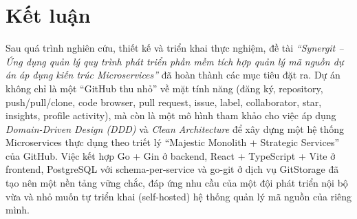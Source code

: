 \chapter{Kết luận}

Sau quá trình nghiên cứu, thiết kế và triển khai thực nghiệm, đề tài \textit{``Synergit -- Ứng dụng quản lý quy trình phát triển phần mềm tích hợp quản lý mã nguồn dự án áp dụng kiến trúc Microservices''} đã hoàn thành các mục tiêu đặt ra. Dự án không chỉ là một ``GitHub thu nhỏ'' về mặt tính năng (đăng ký, repository, push/pull/clone, code browser, pull request, issue, label, collaborator, star, insights, profile activity), mà còn là một mô hình tham khảo cho việc áp dụng \textit{Domain-Driven Design (DDD)} và \textit{Clean Architecture} để xây dựng một hệ thống Microservices thực dụng theo triết lý ``Majestic Monolith + Strategic Services'' của GitHub. Việc kết hợp Go + Gin ở backend, React + TypeScript + Vite ở frontend, PostgreSQL với schema-per-service và go-git ở dịch vụ GitStorage đã tạo nên một nền tảng vững chắc, đáp ứng nhu cầu của một đội phát triển nội bộ vừa và nhỏ muốn tự triển khai (self-hosted) hệ thống quản lý mã nguồn của riêng mình.

